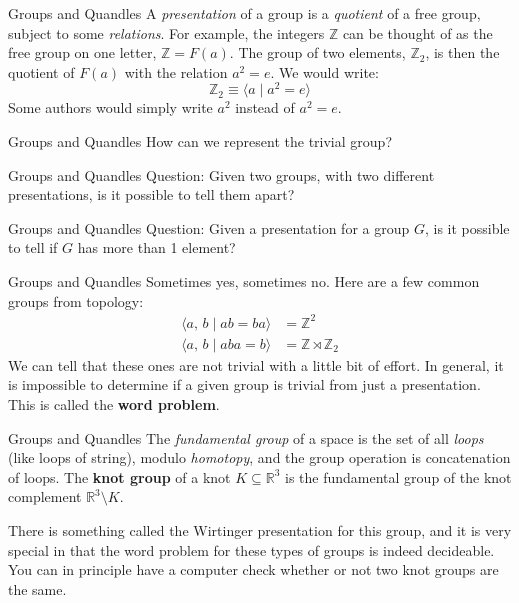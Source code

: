 \documentclass{beamer}
\begin{document}
    \begin{frame}{Groups and Quandles}
        A \textit{presentation} of a group is a \textit{quotient} of a
        free group, subject to some \textit{relations}.
        For example, the integers $\mathbb{Z}$ can be thought of as the
        free group on one letter, $\mathbb{Z}=F(a)$. The group of
        two elements, $\mathbb{Z}_{2}$, is then the quotient of $F(a)$ with
        the relation $a^{2}=e$. We would write:
        \begin{equation}
            \mathbb{Z}_{2}\equiv
            \langle{a}\;|\;a^{2}=e\rangle
        \end{equation}
        Some authors would simply write $a^{2}$ instead of $a^{2}=e$.
    \end{frame}
    \begin{frame}{Groups and Quandles}
        How can we represent the trivial group?
    \end{frame}
    \begin{frame}{Groups and Quandles}
        Question: Given two groups, with two different presentations,
        is it possible to tell them apart?
    \end{frame}
    \begin{frame}{Groups and Quandles}
        Question: Given a presentation for a group $G$, is it possible to
        tell if $G$ has more than 1 element?
    \end{frame}
    \begin{frame}{Groups and Quandles}
        Sometimes yes, sometimes no. Here are a few common groups from topology:
        \begin{align}
            \langle{a,\,b}\;|\;ab=ba\rangle
            &=
            \mathbb{Z}^{2}\\
            \langle{a,\,b}\;|\;aba=b\rangle
            &=
            \mathbb{Z}\rtimes\mathbb{Z}_{2}
        \end{align}
        We can tell that these ones are not trivial with a little bit of effort.
        In general, it is impossible to determine if a given group is trivial
        from just a presentation. This is called the \textbf{word problem}.
    \end{frame}
    \begin{frame}{Groups and Quandles}
        The \textit{fundamental group} of a space is the set of all
        \textit{loops} (like loops of string), modulo \textit{homotopy}, and the
        group operation is concatenation of loops. The \textbf{knot group} of
        a knot $K\subseteq\mathbb{R}^{3}$ is the fundamental group of the knot
        complement $\mathbb{R}^{3}\setminus{K}$.
        \par\hfill\par
        There is something called the Wirtinger presentation for this group,
        and it is very special in that the word problem for these types of groups
        is indeed decideable. You can in principle have a computer check whether
        or not two knot groups are the same.
    \end{frame}
\end{document}
